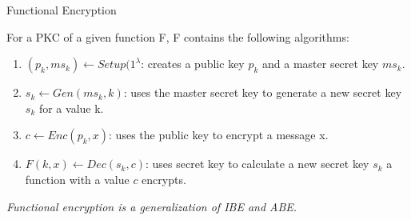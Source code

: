 Functional Encryption

For a PKC of a given function F, F contains the following algorithms:
\begin{enumerate}
    \item $(p_{k},ms_{k}) \leftarrow Setup(1^{\lambda}$: creates a public key $p_{k}$ and a master secret key $ms_{k}$.
    \item $s_{k} \leftarrow Gen(ms_{k}, k)$: uses the master secret key to generate a new secret key $s_{k}$ for a value k.
    \item $c \leftarrow Enc(p_{k}, x)$: uses the public key to encrypt a message x.
    \item $F(k,x) \leftarrow Dec(s_{k},c)$: uses secret key to calculate a new secret key $s_{k}$ a function with a value $c$ encrypts.
\end{enumerate}

\emph{Functional encryption is a generalization of IBE and ABE.} 
